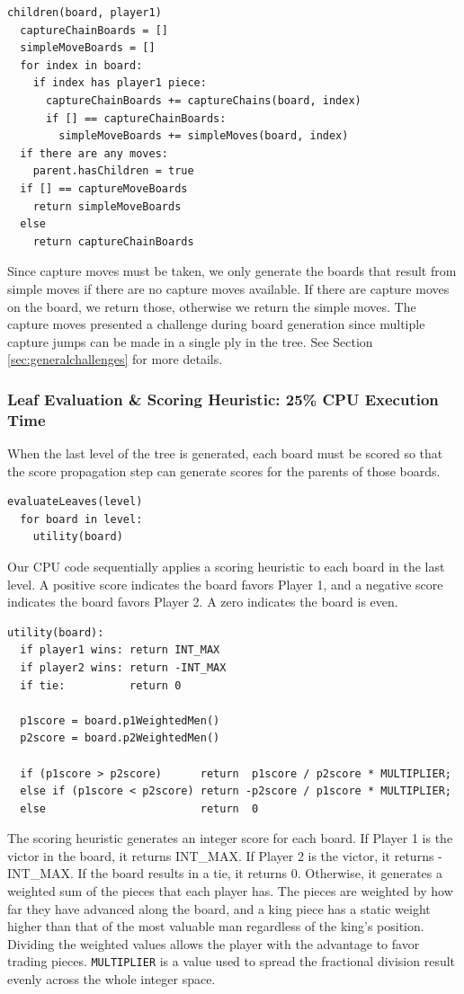 \documentclass[11pt]{article}
\begin{document}
\begin{lstlisting}
children(board, player1)
  captureChainBoards = []
  simpleMoveBoards = []
  for index in board:
    if index has player1 piece:
      captureChainBoards += captureChains(board, index)
      if [] == captureChainBoards:
        simpleMoveBoards += simpleMoves(board, index)
  if there are any moves:
    parent.hasChildren = true
  if [] == captureMoveBoards
    return simpleMoveBoards
  else
    return captureChainBoards
\end{lstlisting}

Since capture moves must be taken, we only generate the boards that result from
simple moves if there are no capture moves available. If there are capture
moves on the board, we return those, otherwise we return the simple moves. The
capture moves presented a challenge during board generation since multiple
capture jumps can be made in a single ply in the tree. See Section 
\ref{sec:generalchallenges} for more details.

\subsubsection{Leaf Evaluation \& Scoring Heuristic: 25\% CPU Execution Time}
When the last level of the tree is generated, each board must be scored so that
the score propagation step can generate scores for the parents of those boards.
\begin{lstlisting}
evaluateLeaves(level)
  for board in level:
    utility(board)
\end{lstlisting}
Our CPU code sequentially applies a scoring heuristic to each board in the last
level. A positive score indicates the board favors Player 1, and a negative
score indicates the board favors Player 2. A zero indicates the board is even.

\begin{lstlisting}
utility(board):
  if player1 wins: return INT_MAX
  if player2 wins: return -INT_MAX
  if tie:          return 0

  p1score = board.p1WeightedMen()
  p2score = board.p2WeightedMen()

  if (p1score > p2score)      return  p1score / p2score * MULTIPLIER;
  else if (p1score < p2score) return -p2score / p1score * MULTIPLIER;
  else                        return  0

\end{lstlisting}
The scoring heuristic generates an integer score for each board. If Player 1 is
the victor in the board, it returns INT\_MAX. If Player 2 is the victor, it
returns -INT\_MAX. If the board results in a tie, it returns 0. Otherwise, it
generates a weighted sum of the pieces that each
player has. The pieces are weighted by how far they have advanced along the
board, and a king piece has a static weight higher than that of the most
valuable man regardless of the king's position. Dividing the weighted values
allows the player with the advantage to favor trading pieces. 
\texttt{MULTIPLIER} is a value used to spread the fractional division result
evenly across the whole integer space.
\end{document}
